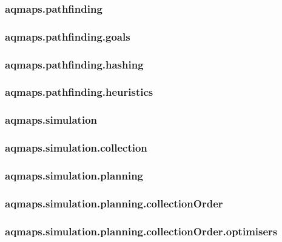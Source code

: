 \documentclass[10pt,a4paper]{article}
\begin{document}
\subsubsection{aqmaps.pathfinding}
\label{sec:aqmaps.pathfinding}

\subsubsection{aqmaps.pathfinding.goals}
\label{sec:aqmaps.pathfinding.goals}

\subsubsection{aqmaps.pathfinding.hashing}
\label{sec:aqmaps.pathfinding.hashing}

\subsubsection{aqmaps.pathfinding.heuristics}
\label{sec:aqmaps.pathfinding.heuristics}

\subsubsection{aqmaps.simulation}
\label{sec:aqmaps.simulation}

\subsubsection{aqmaps.simulation.collection}
\label{sec:aqmaps.simulation.collection}

\subsubsection{aqmaps.simulation.planning}
\label{sec:aqmaps.simulation.planning}

\subsubsection{aqmaps.simulation.planning.collectionOrder}
\label{sec:aqmaps.simulation.planning.collectionOrder}

\subsubsection{aqmaps.simulation.planning.collectionOrder.optimisers}
\label{sec:aqmaps.simulation.planning.collectionOrder.optimisers}
\end{document}
